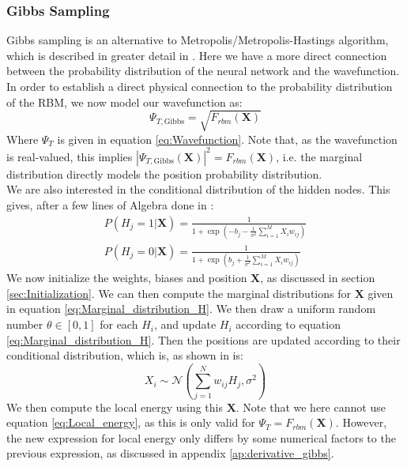 \documentclass[a4paper, 10pt]{article}
\begin{document}
	\subsubsection{Gibbs Sampling}
	Gibbs sampling is an alternative to Metropolis/Metropolis-Hastings algorithm, which is described in greater detail in \cite{Wang2014}. Here we have a more direct connection between the probability distribution of the neural network and the wavefunction. In order to establish a direct physical connection to the probability distribution of the RBM, we now model our wavefunction as:
	\begin{equation}\label{eq:wavefunction_Gibbs}
	\Psi_{T, \mathrm{Gibbs}} =\sqrt{F_{rbm}(\boldsymbol{X})}
	\end{equation}
	Where $\Psi_T$ is given in equation \ref{eq:Wavefunction}. Note that, as the wavefunction is real-valued, this implies $|\Psi_{T, \mathrm{Gibbs}}(\boldsymbol{X})|^2 = F_{rbm}(\boldsymbol{X})$, i.e. the marginal distribution directly models the position probability distribution.\\
	\linebreak
	We are also interested in the conditional distribution of the hidden nodes. This gives, after a few lines of Algebra done in \cite{Hjorth-Jensen2018}:
	\begin{equation}\label{eq:Marginal_distribution_H}
	\begin{split}
	P(H_j=1|\boldsymbol{X})=\frac{1}{1+\exp\left(-b_j-\frac{1}{\sigma^2}\sum_{i=1}^M X_i w_{ij}\right)}\\
	P(H_j=0|\boldsymbol{X})=\frac{1}{1+\exp\left(b_j+\frac{1}{\sigma^2}\sum_{i=1}^M X_i w_{ij}\right)}
	\end{split}
	\end{equation}
	We now initialize the weights, biases and position $\boldsymbol{X}$, as discussed in section \ref{sec:Initialization}. We can then compute the marginal distributions for $\boldsymbol{X}$ given in equation \ref{eq:Marginal_distribution_H}. We then draw a uniform random number $\theta \in [0,1]$ for each $H_i$, and update $H_i$ according to equation \ref{eq:Marginal_distribution_H}. Then the positions are updated according to their conditional distribution, which is, as shown in \cite{Hjorth-Jensen2018} is:
	\begin{equation}
	X_i\sim \mathcal{N}\left(\sum_{j=1}^Nw_{ij}H_j, \sigma^2\right)
	\end{equation}
	We then compute the local energy using this $\boldsymbol{X}$. Note that we here cannot use equation \ref{eq:Local_energy}, as this is only valid for $\Psi_T = F_{rbm}(\boldsymbol{X})$. However, the new expression for local energy only differs by some numerical factors to the previous expression, as discussed in appendix \ref{ap:derivative_gibbs}. 
\end{document}
